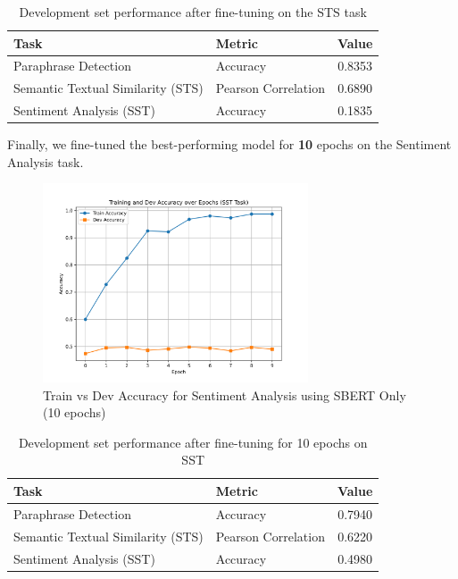 \begin{table}[H]
    \centering
    \begin{tabular}{|l|l|c|}
    \hline
    \textbf{Task} & \textbf{Metric} & \textbf{Value} \\ \hline
    Paraphrase Detection & Accuracy & 0.8353 \\ \hline
    Semantic Textual Similarity (STS) & Pearson Correlation & 0.6890 \\ \hline
    Sentiment Analysis (SST) & Accuracy & 0.1835 \\ \hline
    \end{tabular}
    \caption{Development set performance after fine-tuning on the STS task}
    \label{tab:post_finetuning_sts_metrics}
\end{table}

Finally, we fine-tuned the best-performing model for \textbf{10} epochs on the Sentiment Analysis task.

\begin{figure}[H]
    \centering
    \includegraphics[width=0.7\textwidth]{Figures/SST_plot_10epochs_SBERT_Only.png}
    \caption{Train vs Dev Accuracy for Sentiment Analysis using SBERT Only (10 epochs)}
    \label{fig:sst_acc_plot}
\end{figure}

\begin{table}[H]
    \centering
    \begin{tabular}{|l|l|c|}
    \hline
    \textbf{Task} & \textbf{Metric} & \textbf{Value} \\ \hline
    Paraphrase Detection & Accuracy & 0.7940 \\ \hline
    Semantic Textual Similarity (STS) & Pearson Correlation & 0.6220 \\ \hline
    Sentiment Analysis (SST) & Accuracy & 0.4980 \\ \hline
    \end{tabular}
    \caption{Development set performance after fine-tuning for 10 epochs on SST}
    \label{tab:post_finetuning_metrics}
\end{table}

